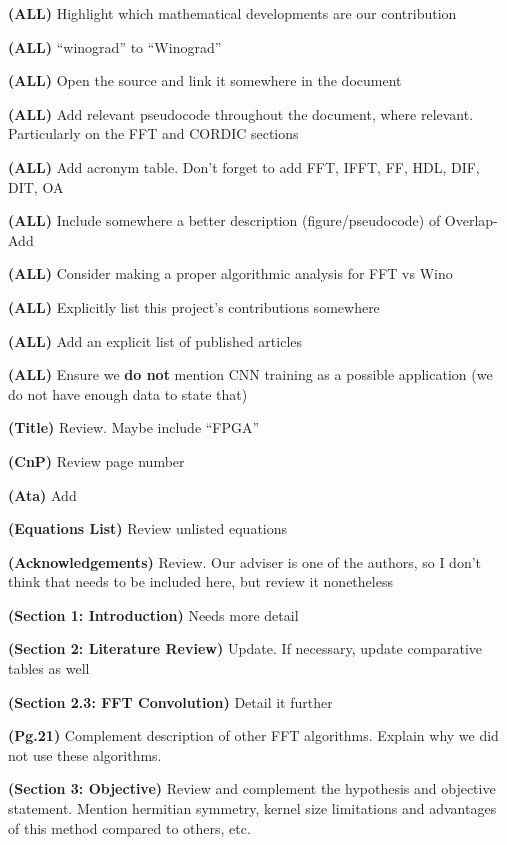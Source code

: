 \documentclass[normalnum]{politex}
\newcommand{\cmark}{\ding{51}}%
\newcommand{\xmark}{\ding{55}}%
\newcommand{\done}{\rlap{$\square$}{\raisebox{2pt}{\large\hspace{1pt}\cmark}}%
\hspace{-2.5pt}}
\newcommand{\wontfix}{\rlap{$\square$}{\large\hspace{1pt}\xmark}}
\begin{document}
\begin{todolist}
  \item[\done] \textbf{(ALL)} Highlight which mathematical developments are our contribution
  \item[\done] \textbf{(ALL)} ``winograd'' to ``Winograd''
  \item \textbf{(ALL)} Open the source and link it somewhere in the document
  \item[\done] \textbf{(ALL)} Add relevant pseudocode throughout the document, where relevant. Particularly on the FFT and CORDIC sections
  \item[\done] \textbf{(ALL)} Add acronym table. Don't forget to add FFT, IFFT, FF, HDL, DIF, DIT, OA
  \item[\done] \textbf{(ALL)} Include somewhere a better description (figure/pseudocode) of Overlap-Add
  \item[\done] \textbf{(ALL)} Consider making a proper algorithmic analysis for FFT vs Wino
  \item[\done] \textbf{(ALL)} Explicitly list this project's contributions somewhere
  \item[\done] \textbf{(ALL)} Add an explicit list of published articles
  \item[\done] \textbf{(ALL)} Ensure we \textbf{do not} mention CNN training as a possible application (we do not have enough data to state that)
  \item[\wontfix] \textbf{(Title)} Review. Maybe include ``FPGA''
  \item \textbf{(CnP)} Review page number
  \item \textbf{(Ata)} Add
  \item[\done] \textbf{(Equations List)} Review unlisted equations
  \item[\done] \textbf{(Acknowledgements)} Review. Our adviser is one of the authors, so I don't think that needs to be included here, but review it nonetheless
  \item[\wontfix] \textbf{(Section 1: Introduction)} Needs more detail
  \item[\done] \textbf{(Section 2: Literature Review)} Update. If necessary, update comparative tables as well
  \item[\done] \textbf{(Section 2.3: FFT Convolution)} Detail it further
  \item[\done] \textbf{(Pg.21)} Complement description of other FFT algorithms. Explain why we did not use these algorithms.
  \item[\done] \textbf{(Section 3: Objective)} Review and complement the hypothesis and objective statement. Mention hermitian symmetry, kernel size limitations and advantages of this method compared to others, etc.

\end{todolist}
\end{document}
